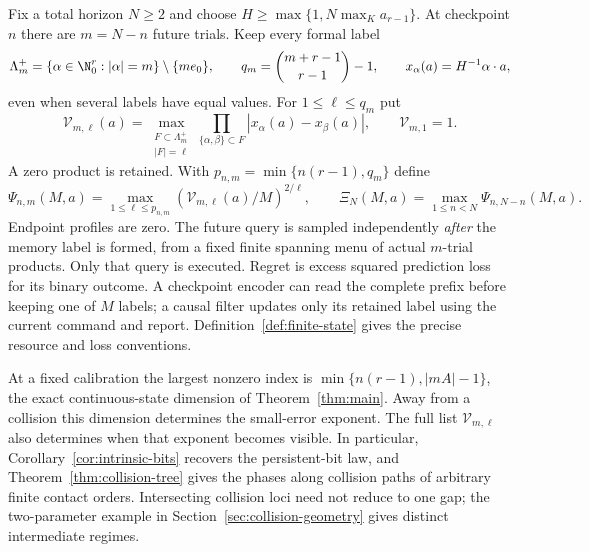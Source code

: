 Fix a total horizon $N\ge2$ and choose
$H\ge\max\{1,N\max_K a_{r-1}\}$. At checkpoint $n$ there are
$m=N-n$ future trials. Keep every formal label
\[
 \Lambda_m^+=\{\alpha\in\N_0^r:|\alpha|=m\}\setminus\{me_0\},
 \qquad q_m=\binom{m+r-1}{r-1}-1,
 \qquad x_\alpha(a)=H^{-1}\alpha\cdot a,
\]
even when several labels have equal values. For $1\le\ell\le q_m$ put
\[
 \mathcal V_{m,\ell}(a)=\max_{\substack{F\subset\Lambda_m^+\\|F|=\ell}}
     \prod_{\{\alpha,\beta\}\subset F}|x_\alpha(a)-x_\beta(a)|,
 \qquad \mathcal V_{m,1}=1.
\]
A zero product is retained. With $p_{n,m}=\min\{n(r-1),q_m\}$ define
\[
 \Psi_{n,m}(M,a)=\max_{1\le\ell\le p_{n,m}}
       (\mathcal V_{m,\ell}(a)/M)^{2/\ell},\qquad
 \Xi_N(M,a)=\max_{1\le n<N}\Psi_{n,N-n}(M,a).
\]
Endpoint profiles are zero. The future query is sampled independently
\emph{after} the memory label is formed, from a fixed finite spanning
menu of actual $m$-trial products. Only that query is executed. Regret
is excess squared prediction loss for its binary outcome. A checkpoint
encoder can read the complete prefix before keeping one of $M$ labels;
a causal filter updates only its retained label using the current
command and report. Definition~\ref{def:finite-state} gives the precise
resource and loss conventions.



At a fixed calibration the largest nonzero index is
$\min\{n(r-1),|mA|-1\}$, the exact continuous-state dimension of
Theorem~\ref{thm:main}. Away from a collision this dimension determines
the small-error exponent. The full list $\mathcal V_{m,\ell}$ also
determines when that exponent becomes visible. In particular,
Corollary~\ref{cor:intrinsic-bits} recovers the persistent-bit law, and
Theorem~\ref{thm:collision-tree} gives the phases along collision paths
of arbitrary finite contact orders. Intersecting collision loci need
not reduce to one gap; the two-parameter example in
Section~\ref{sec:collision-geometry} gives distinct intermediate regimes.

